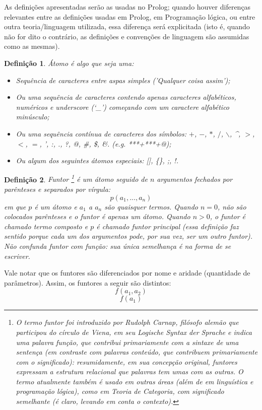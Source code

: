 \documentclass{article}
\newtheorem{definition}{Definição}[section]
\theoremstyle{remark}
\begin{document}
As definições apresentadas serão as usadas no Prolog; quando houver diferenças relevantes entre as definições usadas em Prolog, em Programação lógica, ou entre outra teoria/linguagem utilizada, essa diferença será explicitada (isto é, quando não for dito o contrário, as definições e convenções de linguagem são assumidas como as mesmas).


  \theoremstyle{definition}
  \begin{definition}{Átomo}
  é algo que seja uma:
    \begin{itemize}
      \item Sequência de caracteres entre aspas simples (\textit{'Qualquer coisa assim'});
      \item Ou uma sequência de caracteres contendo apenas caracteres alfabéticos, numéricos e \textit{underscore} (`\_') começando com um caractere alfabético minúsculo;
      \item Ou uma sequência contínua de caracteres dos símbolos: $+$, $-$, $*$, $/$, $\backslash$, \^{}, $>$, $<$, $=$, ', :, ., ?, @, \#, \$, \&. (e.g. ***+***+@);
      \item Ou algum dos seguintes átomos especiais: [], \{\}, ;, !.
    \end{itemize}
  \end{definition}


  \theoremstyle{definition}
  \begin{definition}{Funtor}
    \footnote{ O termo \textit{funtor} foi introduzido por Rudolph Carnap, filósofo alemão que participou do círculo de Viena, em seu \textit{Logische Syntax der Sprache} e indica uma \textit{palavra função}, que contribui primariamente com a sintaxe de uma sentença (em contraste com \textit{palavras conteúdo}, que contribuem primariamente com o significado): resumidamente, em sua concepção original, funtores expressam a estrutura relacional que palavras tem umas com as outras. O termo atualmente também é usado em outras áreas (além de em linguística e programação lógica), como em \textit{Teoria de Categoria}, com   significado semelhante (é claro, levando em conta o contexto).  }
    é um átomo seguido de $n$ argumentos fechados por parênteses e separados por vírgula:
    \[
      p(a_1, ..., a_n)
    \]
\noindent em que $p$ é um átomo e $a_1$ a $a_n$ são quaisquer termos. Quando $n = 0$, não são colocados parênteses e o funtor é apenas um átomo. Quando $n > 0$, o funtor é chamado \textit{termo composto} e $p$ é chamado \textit{funtor principal} (essa definição faz sentido porque cada um dos argumentos pode, por sua vez, ser um outro funtor).
  Não confunda funtor com função: sua única semelhança é na forma de se escriver.
  \end{definition}
Vale notar que os funtores são diferenciados por nome e aridade (quantidade de parâmetros). Assim, os funtores a seguir são distintos:
    \[
      f(a_1, a_2)
    \]
    \[
      f(a_1)
    \]
\end{document}
